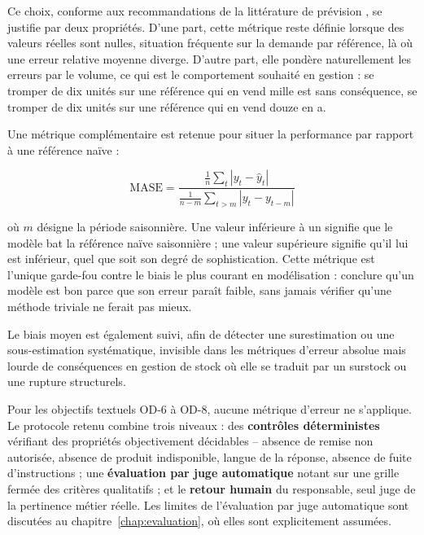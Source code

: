 Ce choix, conforme aux recommandations de la littérature de prévision \cite{hyndman2021fpp,makridakis2020m4}, se justifie par deux propriétés. D'une part, cette métrique reste définie lorsque des valeurs réelles sont nulles, situation fréquente sur la demande par référence, là où une erreur relative moyenne diverge. D'autre part, elle pondère naturellement les erreurs par le volume, ce qui est le comportement souhaité en gestion : se tromper de dix unités sur une référence qui en vend mille est sans conséquence, se tromper de dix unités sur une référence qui en vend douze en a.

Une métrique complémentaire est retenue pour situer la performance par rapport à une référence naïve :

\begin{equation}
\mathrm{MASE} = \frac{\frac{1}{n}\sum_{t} \left| y_t - \hat{y}_t \right|}{\frac{1}{n-m}\sum_{t>m} \left| y_t - y_{t-m} \right|}
\end{equation}

où $m$ désigne la période saisonnière. Une valeur inférieure à un signifie que le modèle bat la référence naïve saisonnière ; une valeur supérieure signifie qu'il lui est inférieur, quel que soit son degré de sophistication. Cette métrique est l'unique garde-fou contre le biais le plus courant en modélisation : conclure qu'un modèle est bon parce que son erreur paraît faible, sans jamais vérifier qu'une méthode triviale ne ferait pas mieux.

Le biais moyen est également suivi, afin de détecter une surestimation ou une sous-estimation systématique, invisible dans les métriques d'erreur absolue mais lourde de conséquences en gestion de stock où elle se traduit par un surstock ou une rupture structurels.

Pour les objectifs textuels OD-6 à OD-8, aucune métrique d'erreur ne s'applique. Le protocole retenu combine trois niveaux : des \textbf{contrôles déterministes} vérifiant des propriétés objectivement décidables -- absence de remise non autorisée, absence de produit indisponible, langue de la réponse, absence de fuite d'instructions ; une \textbf{évaluation par juge automatique} \cite{zheng2023judge} notant sur une grille fermée des critères qualitatifs ; et le \textbf{retour humain} du responsable, seul juge de la pertinence métier réelle. Les limites de l'évaluation par juge automatique sont discutées au chapitre~\ref{chap:evaluation}, où elles sont explicitement assumées.

